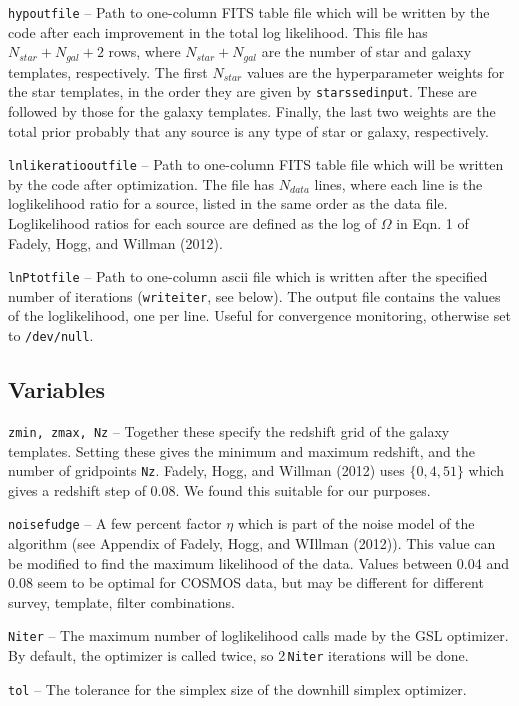 \documentclass[12pt,preprint]{aastex}
\begin{document}
{\tt hypoutfile} -- Path to one-column FITS table file which will be written by the code 
after each improvement in the total log likelihood.  This file has $N_{star}+N_{gal}+2$
rows, where $N_{star}+N_{gal}$ are the number of star and galaxy templates, 
respectively.  The first $N_{star}$ values are the hyperparameter weights for the 
star templates, in the order they are given by {\tt starssedinput}.  These are followed by 
those for the galaxy templates.  Finally, the last two weights are the total prior probably 
that any source is any type of star or galaxy, respectively.

{\tt lnlikeratiooutfile} -- Path to one-column FITS table file which will be written by the code 
after optimization.  The file has $N_{data}$ lines, where each line is the loglikelihood ratio 
for a source, listed in the same order as the data file.  Loglikelihood ratios for each source 
are defined as the log of $\Omega$ in Eqn. 1 of Fadely, Hogg, and Willman (2012).

{\tt lnPtotfile} -- Path to one-column ascii file which is written after the specified 
number of iterations ({\tt writeiter}, see below).  The output file contains the values of the 
loglikelihood, one per line.  Useful for convergence monitoring, otherwise set to 
{\tt /dev/null}.

\subsection{Variables}

{\tt zmin, zmax, Nz}  -- Together these specify the redshift grid of the galaxy templates.  
Setting these gives the minimum and maximum redshift, and the number of gridpoints 
{\tt Nz}.  Fadely, Hogg, and Willman (2012) uses $\{0,4,51\}$ which gives a redshift 
step of 0.08.  We found this suitable for our purposes.

{\tt noisefudge} -- A few percent factor $\eta$ which is part of the noise model of the 
algorithm (see Appendix of Fadely, Hogg, and WIllman (2012)).  This value can be 
modified to find the maximum likelihood of the data.  Values between 0.04 and 0.08 
seem to be optimal for COSMOS data, but may be different for different survey, template, 
filter combinations.

{\tt Niter} -- The maximum number of loglikelihood calls made by the GSL optimizer.  By 
default, the optimizer is called twice, so 2\,{\tt Niter} iterations will be done.

{\tt tol} -- The tolerance for the simplex size of the downhill simplex optimizer. 
\end{document}
